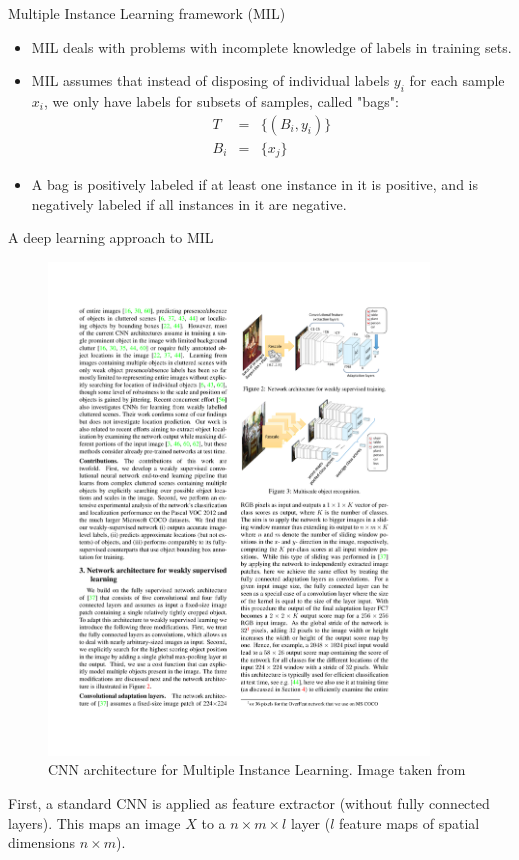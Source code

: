 \documentclass[xcolor=pdftex,dvipsnames,table]{beamer}
\begin{document}
\begin{frame}{Multiple Instance Learning framework (MIL)}
\begin{itemize}
\item MIL deals with problems with incomplete knowledge of labels in training sets.
\item MIL assumes that instead of disposing of individual labels $y_i$ for each sample $x_i$, we only have labels for subsets of samples, called "bags": 
\begin{eqnarray}
T &=& \{(B_i, y_i)\} \nonumber \\
B_i &=& \{x_j\}
\end{eqnarray}
\item A bag is positively labeled if at least one instance in it is positive, and is negatively labeled if all instances in it are negative.
\end{itemize}
\end{frame}

\begin{frame}{A deep learning approach to MIL}
\begin{figure}[htb]
   \centering
   \includegraphics[width=0.9\textwidth]{../graphics/mil_deep_learning_v1.pdf}
   \caption{CNN architecture for Multiple Instance Learning. Image taken from \cite{Oquab2015}}
\end{figure}
First, a standard CNN is applied as feature extractor (without fully connected layers). This maps an image $X$ to a $n \times m \times l$ layer ($l$ feature maps of spatial dimensions $n \times m$). 
\end{frame}
\end{document}
